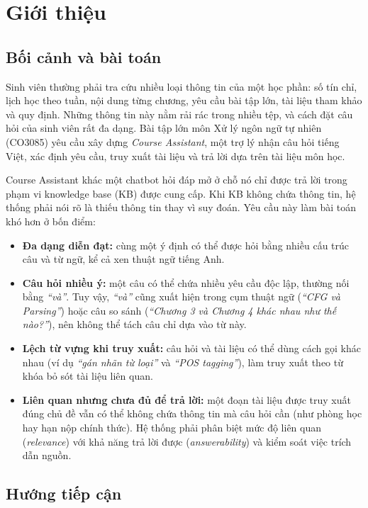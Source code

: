 \chapter{Giới thiệu}

\section{Bối cảnh và bài toán}

Sinh viên thường phải tra cứu nhiều loại thông tin của một học phần: số tín chỉ, lịch học theo tuần, nội dung từng chương, yêu cầu bài tập lớn, tài liệu tham khảo và quy định. Những thông tin này nằm rải rác trong nhiều tệp, và cách đặt câu hỏi của sinh viên rất đa dạng. Bài tập lớn môn Xử lý ngôn ngữ tự nhiên (CO3085) \cite{assignment} yêu cầu xây dựng \emph{Course Assistant}, một trợ lý nhận câu hỏi tiếng Việt, xác định yêu cầu, truy xuất tài liệu và trả lời dựa trên tài liệu môn học.

Course Assistant khác một chatbot hỏi đáp mở ở chỗ nó chỉ được trả lời trong phạm vi knowledge base (KB) được cung cấp. Khi KB không chứa thông tin, hệ thống phải nói rõ là thiếu thông tin thay vì suy đoán. Yêu cầu này làm bài toán khó hơn ở bốn điểm:

\begin{itemize}
  \item \textbf{Đa dạng diễn đạt:} cùng một ý định có thể được hỏi bằng nhiều cấu trúc câu và từ ngữ, kể cả xen thuật ngữ tiếng Anh.
  \item \textbf{Câu hỏi nhiều ý:} một câu có thể chứa nhiều yêu cầu độc lập, thường nối bằng \emph{``và''}. Tuy vậy, \emph{``và''} cũng xuất hiện trong cụm thuật ngữ (\emph{``CFG và Parsing''}) hoặc câu so sánh (\emph{``Chương 3 và Chương 4 khác nhau như thế nào?''}), nên không thể tách câu chỉ dựa vào từ này.
  \item \textbf{Lệch từ vựng khi truy xuất:} câu hỏi và tài liệu có thể dùng cách gọi khác nhau (ví dụ \emph{``gán nhãn từ loại''} và \emph{``POS tagging''}), làm truy xuất theo từ khóa bỏ sót tài liệu liên quan.
  \item \textbf{Liên quan nhưng chưa đủ để trả lời:} một đoạn tài liệu được truy xuất đúng chủ đề vẫn có thể không chứa thông tin mà câu hỏi cần (như phòng học hay hạn nộp chính thức). Hệ thống phải phân biệt mức độ liên quan (\emph{relevance}) với khả năng trả lời được (\emph{answerability}) và kiểm soát việc trích dẫn nguồn.
\end{itemize}

\section{Hướng tiếp cận}

